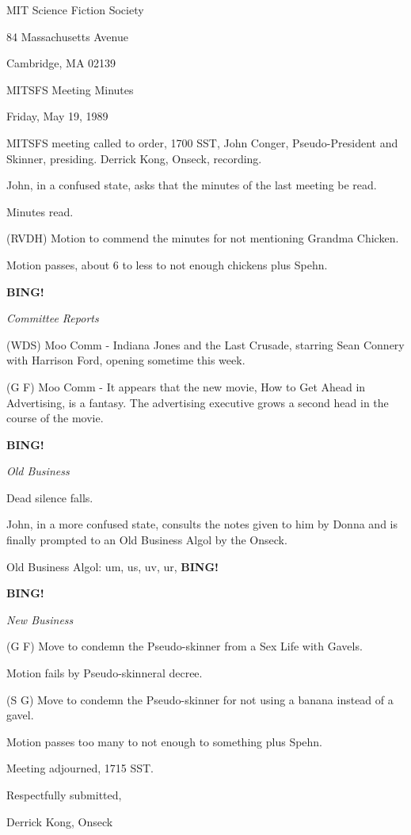 \documentclass[12pt]{article}
\newcommand{\bing}{{\bf BING!} }
\newcommand{\goto}[1]{\bing \vskip 12pt \centerline{{\em{#1}}}}
\begin{document}
\begin{center}

MIT Science Fiction Society 

84 Massachusetts Avenue

Cambridge, MA 02139

\vspace{12pt}

MITSFS Meeting Minutes 

Friday, May 19, 1989

\end{center}
 
\vspace{18pt}

\setlength{\parskip}{6pt}

\noindent
MITSFS meeting called to order, 1700 SST, John Conger, Pseudo-President and Skinner, presiding. Derrick Kong, Onseck, recording.

John, in a confused state, asks that the minutes of the last meeting be read.

Minutes read.

(RVDH) Motion to commend the minutes for not mentioning Grandma Chicken.

Motion passes, about 6 to less to not enough chickens plus Spehn.

\goto{Committee Reports}

(WDS) Moo Comm - Indiana Jones and the Last Crusade, starring Sean Connery with Harrison Ford, opening sometime this week.

(G F) Moo Comm - It appears that the new movie, How to Get Ahead in Advertising, is a fantasy. The advertising executive grows a second head in the course of the movie.

\goto{Old Business}

Dead silence falls.

John, in a more confused state, consults the notes given to him by Donna and is finally prompted to an Old Business Algol by the Onseck.

Old Business Algol: um, us, uv, ur, \bing

\goto{New Business}

(G F) Move to condemn the Pseudo-skinner from a Sex Life with Gavels.

Motion fails by Pseudo-skinneral decree.

(S G) Move to condemn the Pseudo-skinner for not using a banana instead of a gavel.

Motion passes too many to not enough to something plus Spehn.

\vspace{12pt}

\noindent
Meeting adjourned, 1715 SST.

\vspace{18pt}

\centerline{Respectfully submitted,}
\centerline{Derrick Kong, Onseck}
\end{document}

